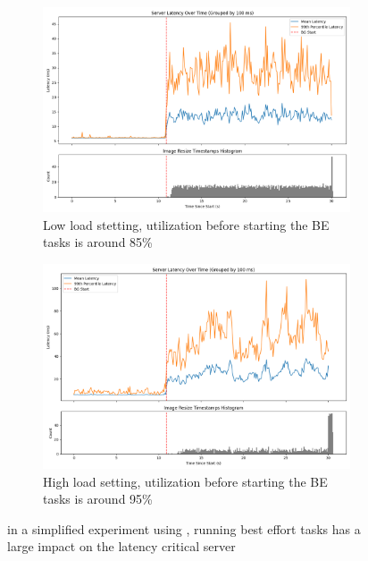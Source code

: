 \begin{figure}[t]
    \centering
    \begin{subfigure}{\columnwidth}
        \includegraphics[width=\columnwidth]{graphs/srv-bg-weight-150-low.png}
        \caption{Low load stetting, utilization before starting the BE tasks is
        around 85\%}\label{fig:srv-bg-weight-150-low}
        \vspace{12pt}
    \end{subfigure}
    \hspace{\fill}
    \begin{subfigure}{\columnwidth}
        \includegraphics[width=\columnwidth]{graphs/srv-bg-weight-150-high.png}
        \caption{High load setting, utilization before starting the BE tasks is
        around 95\%}\label{fig:srv-bg-weight-150-high}
    \end{subfigure}
    \vspace{4pt}
    \caption{in a simplified experiment using \cgroups{}, running best effort
    tasks has a large impact on the latency critical
    server}\label{fig:srv-bg-weight-150}
\end{figure}

